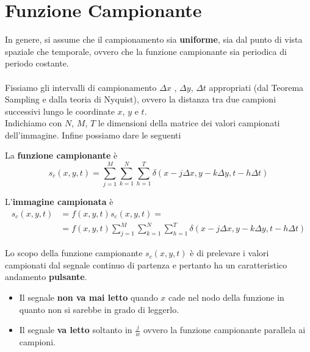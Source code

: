 \section{Funzione Campionante}
In genere, si assume che il campionamento sia \textbf{uniforme}, sia dal punto
di vista spaziale che temporale, ovvero che la funzione campionante sia
periodica di periodo costante. \\\\Fissiamo gli intervalli di campionamento
$\Delta x$ , $\Delta y$, $\Delta t$ appropriati (dal Teorema Sampling e dalla
teoria di Nyquist), ovvero la distanza tra due campioni successivi lungo le
coordinate $x$, $y$ e $t$.\\Indichiamo con $N$, $M$, $T$ le dimensioni della
matrice dei valori campionati dell'immagine. Infine possiamo dare le seguenti

\begin{definition}
    La \textbf{funzione campionante} è
    $$
        s_c(x,y,t) = \sum_{j=1}^{M} \sum_{k=1}^{N}\sum_{h=1}^{T} \delta (x-j\Delta x, y - k
        \Delta y, t - h  \Delta t )
    $$
\end{definition}

\begin{definition}
    L'\textbf{immagine campionata} è
    \begin{equation}
        \begin{aligned}
            s_c(x,y,t) & = f(x,y,t)s_c(x,y,t) =                                                                                         \\
                       & = f(x,y,t) \sum_{j=1}^{M} \sum_{k=1}^{N}\sum_{h=1}^{T} \delta (x-j \Delta x, y - k \Delta y, t - h  \Delta t )
        \end{aligned}
    \end{equation}
\end{definition}

Lo scopo della funzione campionante $s_c(x , y, t)$ è di prelevare i valori
campionati dal segnale continuo di partenza e pertanto ha un caratteristico
andamento \textbf{pulsante}.

\begin{itemize}
    \item Il segnale \textbf{non va mai letto}
          quando $x$ cade nel nodo della funzione in quanto non si sarebbe in
          grado di leggerlo.
    \item Il segnale \textbf{va letto}
          soltanto in $\frac{j}{w}$ ovvero la funzione campionante parallela ai
          campioni.
\end{itemize}

